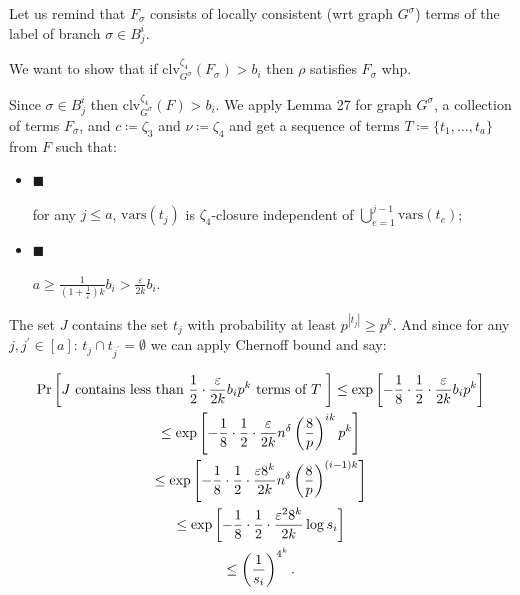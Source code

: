 \documentclass[10pt,a4paper]{article}
\begin{document}
Let us remind that $F_{\sigma}$ consists of locally consistent (wrt graph $G^{\sigma}$) terms of the
label of branch $\sigma\in B^{i}_{j}$.\par




We want to show that if $\mathrm{clv}_{G^{\sigma}}^{\zeta_{4}}\left(F_{\sigma}\right)>b_{i}$ then $\rho$ satisfies
$F_{\sigma}$ whp.\par




Since $\sigma\in B^{i}_{j}$ then $\mathrm{clv}_{G^{\sigma}}^{\zeta_{4}}\left(F\right)>b_{i}$. We apply Lemma
27 for graph $G^{\sigma}$, a collection of terms $F_{\sigma}$, and
$c\coloneqq\zeta_{3}$ and $\nu\coloneqq\zeta_{4}$ and get a sequence of terms
$T\coloneqq\{t_{1},\dots,t_{a}\}$ from $F$ such that:\par


\begin{itemize}


\item[] 
$\blacksquare$ 


for any $j\leq a$, $\mathrm{vars}(t_{j})$ is $\zeta_{4}$-closure independent of
$\bigcup\limits_{e=1}^{j-1}\mathrm{vars}(t_{e})$;\par





\item[] 
$\blacksquare$ 


$a\geq\frac{1}{(1+\frac{1}{\varepsilon})k}b_{i}>\frac{\varepsilon}{2k}b_{i}$.\par





\end{itemize}




The set $J$ contains the set $t_{j}$ with probability at least $p^{|t_{j}|}\geq p^{k}$. And since for
any $j,j^{\prime}\in[a]$: $t_{j}\cap t_{j^{\prime}}=\emptyset$ we can apply Chernoff bound and say:\par


\[\begin{gathered}
\displaystyle\Pr\left[J\text{ contains less than $\frac{1}{2}\cdot\frac{%
\varepsilon}{2k}b_{i}p^{k}$ terms of $T$ }\right] \displaystyle\leq\exp\left[-\frac{1}{8}\cdot\frac{1}{2}\cdot\frac{\varepsilon}%
{2k}b_{i}p^{k}\right] \\
\displaystyle\leq\exp\left[-\frac{1}{8}\cdot\frac{1}{2}\cdot\frac{\varepsilon}%
{2k}n^{\delta}\left(\frac{8}{p}\right)^{ik}p^{k}\right] \\
\displaystyle\leq\exp\left[-\frac{1}{8}\cdot\frac{1}{2}\cdot\frac{\varepsilon 8%
^{k}}{2k}n^{\delta}\left(\frac{8}{p}\right)^{(i-1)k}\right] \\
\displaystyle\leq\exp\left[-\frac{1}{8}\cdot\frac{1}{2}\cdot\frac{\varepsilon^%
{2}8^{k}}{2k}\log s_{i}\right] \\
\displaystyle\leq\left(\frac{1}{s_{i}}\right)^{4^{k}}.
\end{gathered}\]
\end{document}
